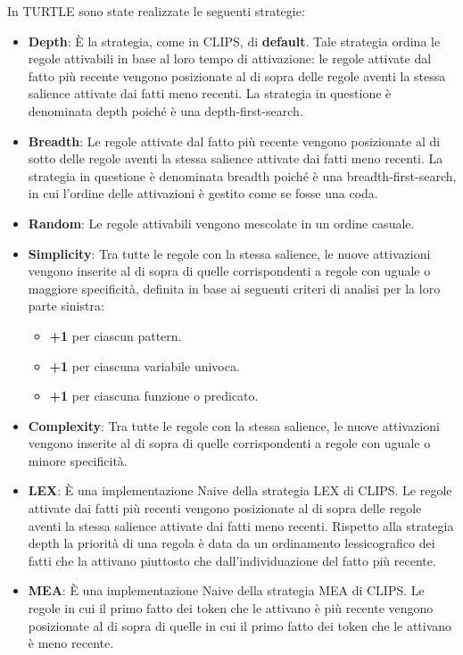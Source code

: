 In TURTLE sono state realizzate le seguenti strategie:
\begin{itemize}
\item\textbf{Depth}: È la strategia, come in CLIPS, di \textbf{default}. Tale strategia ordina le regole attivabili in base al loro tempo di attivazione: le regole attivate dal fatto più recente vengono posizionate al di sopra delle regole aventi la stessa salience attivate dai fatti meno recenti. La strategia in questione è denominata depth poiché è una depth-first-search.
\item\textbf{Breadth}: Le regole attivate dal fatto più recente vengono posizionate al di sotto delle regole aventi la stessa salience attivate dai fatti meno recenti. La strategia in questione è denominata breadth poiché è una breadth-first-search, in cui l'ordine delle attivazioni è gestito come se fosse una coda.
\item\textbf{Random}: Le regole attivabili vengono mescolate in un ordine casuale.
\item\textbf{Simplicity}: Tra tutte le regole con la stessa salience, le nuove attivazioni vengono inserite al di sopra di quelle corrispondenti a regole con uguale o maggiore specificità, definita in base ai seguenti criteri di analisi per la loro parte sinistra:
	\begin{itemize}
	\renewcommand{\labelitemii}{$\cdot$}
	\item\textbf{+1} per ciascun pattern.
	\item\textbf{+1} per ciascuna variabile univoca.
	\item\textbf{+1} per ciascuna funzione o predicato.
	\end{itemize}
\item\textbf{Complexity}: Tra tutte le regole con la stessa salience, le nuove attivazioni vengono inserite al di sopra di quelle corrispondenti a regole con uguale o minore specificità.
\item\textbf{LEX}: È una implementazione Naive della strategia LEX di CLIPS. Le regole attivate dai fatti più recenti vengono posizionate al di sopra delle regole aventi la stessa salience attivate dai fatti meno recenti. Rispetto alla strategia depth la priorità di una regola è data da un ordinamento lessicografico dei fatti che la attivano piuttosto che dall'individuazione del fatto più recente.
\item\textbf{MEA}: È una implementazione Naive della strategia MEA di CLIPS. Le regole in cui il primo fatto dei token che le attivano è più recente vengono posizionate al di sopra di quelle in cui il primo fatto dei token che le attivano è meno recente.
\end{itemize}

